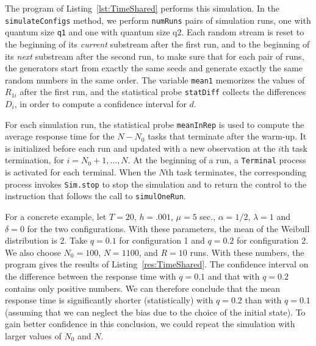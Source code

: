 
The program of Listing~\ref{lst:TimeShared} performs this simulation.
In the \texttt{simulateConfigs} method, we perform \texttt{numRuns}
pairs of simulation runs, one with quantum size \texttt{q1} and one
with quantum size {q2}.
Each random stream is reset to the beginning of its \emph{current} substream
after the first run, and to the beginning of its \emph{next} substream
after the second run, to make sure that for each pair of runs,
the generators start from exactly the same
seeds and generate exactly the same random numbers in the same order.
The variable \texttt{mean1} memorizes the values of $R_{1i}$ after the
first run, and the statistical probe \texttt{statDiff} collects the
differences $D_i$, in order to compute a confidence interval for $d$.

For each simulation run, the statistical probe \texttt{meanInRep}
is used to compute the average response time for the $N - N_0$ tasks
that terminate after the warm-up.
It is initialized before each run and updated with a new observation
at the $i$th task termination, for $i = N_0+1,\dots,N$.
At the beginning of a run, a \texttt{Terminal} process is activated for
each terminal.  When the $N$th task terminates, the corresponding
process invokes \texttt{Sim.stop} to stop the simulation and
to return the control to
the instruction that follows the call to \texttt{simulOneRun}.


\iffalse  %
\setbox3=\vbox {\hsize = 6.0in
\begin{verbatim}
REPORT on Tally stat. collector ==> Differences on mean response times
   min          max        average      standard dev.   nb. obs.
   -0.134      0.369        0.168         0.175            10

        90.0% confidence interval for mean (student): ( 0.067, 0.269 )
\end{verbatim}
}

\begin{figure}[ht]
\centerline{\boxit{\box3}}
\caption {Difference in the mean response times for $q=0.1$ and $q=0.2$
    for the time shared system.}
\label {fig:timeshared-res}
\end{figure}
\fi   %

For a concrete example, let $T=20$, $h=.001$, $\mu=5$ sec., $\alpha=1/2$,
$\lambda=1$ and $\delta=0$ for the two configurations.
With these parameters, the mean of the Weibull distribution is 2.
Take $q=0.1$ for configuration 1 and $q=0.2$ for configuration 2.
We also choose $N_0=100$, $N=1100$, and $R=10$ runs.
With these numbers, the program gives the results of
Listing~\ref{res:TimeShared}.
The confidence interval on the difference between the response time
with $q=0.1$ and that with $q=0.2$ contains only positive numbers.
We can therefore conclude that
the mean response time is significantly shorter (statistically)
with $q=0.2$ than with $q = 0.1$ (assuming that we can neglect the
bias due to the choice of the initial state).
To gain better confidence in this conclusion, we could repeat the
simulation with larger values of $N_0$ and $N$.

